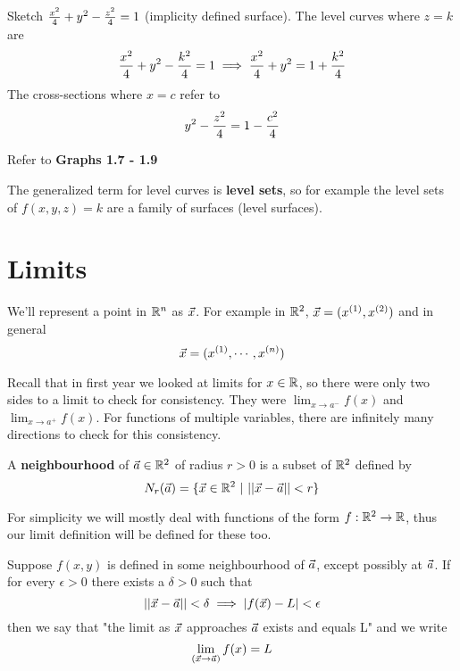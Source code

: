 \documentclass[english, 11pt]{article}
\begin{document}
\begin{exmp}
  Sketch $\frac{x^2}{4} + y^2 - \frac{z^2}{4} = 1$ (implicity defined surface). The level curves where $z = k$ are
  \[ \frac{x^2}{4} + y^2 - \frac{k^2}{4} = 1 \implies \frac{x^2}{4} + y^2 = 1 + \frac{k^2}{4} \]
  The cross-sections where $x = c$ refer to
  \[ y^2 - \frac{z^2}{4} = 1 - \frac{c^2}{4} \]
  \begin{center}
     Refer to \textbf{Graphs 1.7 - 1.9}
     \end{center}
\end{exmp}
The generalized term for level curves is \textbf{level sets}, so for example the level sets of $f(x,y,z) = k$ are a family of surfaces (level surfaces).

\section{Limits}

\begin{notation}
  We'll represent a point in ${\mathbb{R}}^n$ as $\vec{x}$. For example in ${\mathbb{R}}^2$, $\vec{x} = (x^{(1)},x^{(2)})$ and in general
  \[ \vec{x} = (x^{(1)}, \cdots, x^{(n)}) \]
\end{notation}

Recall that in first year we looked at limits for $x \in {\mathbb{R}}$, so there were only two sides to a limit to check for consistency. They were $\lim_{x \rightarrow a^-} f(x)$ and $\lim_{x \rightarrow a^+} f(x)$. For functions of multiple variables, there are infinitely many directions to check for this consistency.

\begin{defn}[neighbourhood]\label{neighbourhood}
  A \textbf{neighbourhood} of $\vec{a} \in {\mathbb{R}}^2$ of radius $r > 0$ is a subset of ${\mathbb{R}}^2$ defined by
  \[ N_r(\vec{a}) = \{ \vec{x} \in {\mathbb{R}}^2 \ | \  ||\vec{x} - \vec{a}|| < r \} \]
\end{defn}

For simplicity we will mostly deal with functions of the form $f : {\mathbb{R}}^2 \rightarrow {\mathbb{R}}$, thus our limit definition will be defined for these too.

\begin{defn}
  Suppose $f(x,y)$ is defined in some neighbourhood of $\vec{a}$, except possibly at $\vec{a}$. If for every $\epsilon > 0$ there exists a $\delta > 0$ such that
  \[ ||\vec{x} - \vec{a}|| < \delta \implies |f(\vec{x}) - L| < \epsilon \]
  then we say that "the limit as $\vec{x}$ approaches $\vec{a}$ exists and equals L" and we write
  \[ \lim_{(\vec{x} \rightarrow \vec{a})} f(x) = L \]
\end{defn}
\end{document}
